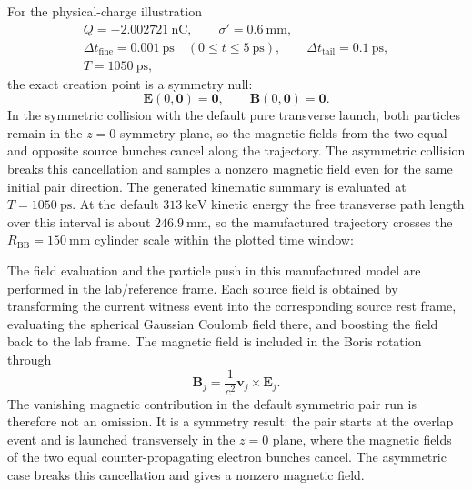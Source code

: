 \documentclass[11pt]{article}
\newcommand{\vect}[1]{\boldsymbol{#1}}
\newcommand{\E}{\vect{E}}
\newcommand{\B}{\vect{B}}
\numberwithin{equation}{section}
\begin{document}
For the physical-charge illustration
\begin{equation}
\begin{split}
  Q=-2.002721~\mathrm{nC},\qquad
  \sigma'=0.6~\mathrm{mm},\\
  \Delta t_{\mathrm{fine}}=0.001~\mathrm{ps}\quad(0\le t\le 5~\mathrm{ps}),
  \qquad
  \Delta t_{\mathrm{tail}}=0.1~\mathrm{ps},\\
  T=1050~\mathrm{ps},
\end{split}
\end{equation}
the exact creation point is a symmetry null:
\begin{equation}
  \E(0,\vect 0)=\vect 0,
  \qquad
  \B(0,\vect 0)=\vect 0.
\end{equation}
In the symmetric collision with the default pure transverse launch, both
particles remain in the \(z=0\) symmetry plane, so the magnetic fields from the
two equal and opposite source bunches cancel along the trajectory.  The
asymmetric collision breaks this cancellation and samples a nonzero magnetic
field even for the same initial pair direction.  The generated kinematic
summary is evaluated at \(T=1050~\mathrm{ps}\).  At the default
\(313~\mathrm{keV}\) kinetic energy the free transverse path length over this
interval is about \(246.9~\mathrm{mm}\), so the manufactured trajectory crosses
the \(R_{\mathrm{BB}}=150~\mathrm{mm}\) cylinder scale within the plotted time
window:

\begin{center}
\small
\resizebox{\textwidth}{!}{%

}
\end{center}

The field evaluation and the particle push in this manufactured model are
performed in the lab/reference frame.  Each source field is obtained by
transforming the current witness event into the corresponding source rest
frame, evaluating the spherical Gaussian Coulomb field there, and boosting the
field back to the lab frame.  The magnetic field is included in the Boris
rotation through
\begin{equation}
  \B_j = \frac{1}{c^2}\vect v_j\times\E_j .
\end{equation}
The vanishing magnetic contribution in the default symmetric pair run is
therefore not an omission.  It is a symmetry result: the pair starts at the
overlap event and is launched transversely in the \(z=0\) plane, where the
magnetic fields of the two equal counter-propagating electron bunches cancel.
The asymmetric case breaks this cancellation and gives a nonzero magnetic field.
\end{document}
